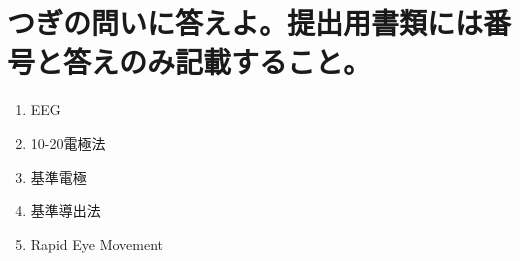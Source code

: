 \documentclass[titlepage,a4paper]{jsarticle}
\begin{document}
\section{つぎの問いに答えよ。提出用書類には番号と答えのみ記載すること。}%
\begin{enumerate}
  \item EEG
  \item 10-20電極法
  \item 基準電極
  \item 基準導出法
  \item Rapid Eye Movement
\end{enumerate}
\end{document}
